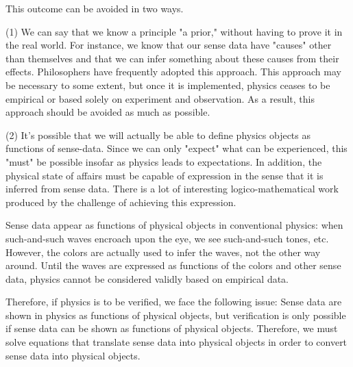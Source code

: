 \documentclass[a4paper,12pt]{book}[2004/02/16]
\theoremstyle{ilemma}
\theoremstyle{itheorem}
\theoremstyle{iother}
\theoremstyle{icorollary}
\theoremstyle{numcorollary}
\theoremstyle{idefinition}
\begin{document}
This outcome can be avoided in two ways.

(1) We can say that we know a principle "a prior," without having to prove it in the real world. For instance, we know that our sense data have "causes" other than themselves and that we can infer something about these causes from their effects. Philosophers have frequently adopted this approach. This approach may be necessary to some extent, but once it is implemented, physics ceases to be empirical or based solely on experiment and observation. As a result, this approach should be avoided as much as possible.

(2) It's possible that we will actually be able to define physics objects as functions of sense-data. Since we can only "expect" what can be experienced, this "must" be possible insofar as physics leads to expectations. In addition, the physical state of affairs must be capable of expression in the sense that it is inferred from sense data. There is a lot of interesting logico-mathematical work produced by the challenge of achieving this expression.

Sense data appear as functions of physical objects in conventional physics: when such-and-such waves encroach upon the eye, we
see such-and-such tones, etc. However, the colors are actually used to infer the waves, not the other way around. Until the waves are expressed as functions of the colors and other sense data, physics cannot be considered validly based on empirical data.

Therefore, if physics is to be verified, we face the following issue: Sense data are shown in physics as functions of physical objects, but verification is only possible if sense data can be shown as functions of physical objects. Therefore, we must solve equations that translate sense data into physical objects in order to convert sense data into physical objects.
\end{document}

